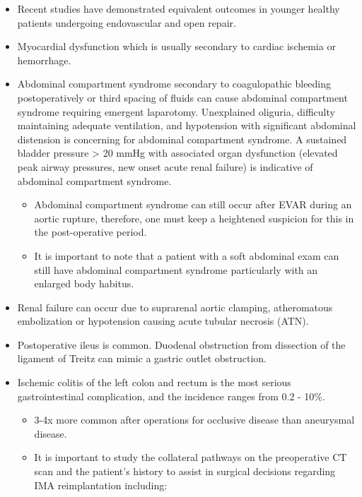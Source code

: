 \documentclass[
]{book}
\begin{document}
\begin{itemize}
\item
  Recent studies have demonstrated equivalent outcomes in younger
  healthy patients undergoing endovascular and open repair.
  \citep{liangComparablePerioperativeMortality2018}
\item
  Myocardial dysfunction which is usually secondary to cardiac
  ischemia or hemorrhage.
\item
  Abdominal compartment syndrome secondary to coagulopathic bleeding
  postoperatively or third spacing of fluids can cause abdominal
  compartment syndrome requiring emergent laparotomy. Unexplained
  oliguria, difficulty maintaining adequate ventilation, and
  hypotension with significant abdominal distension is concerning for
  abdominal compartment syndrome. A sustained bladder pressure \textgreater{} 20
  mmHg with associated organ dysfunction (elevated peak airway
  pressures, new onset acute renal failure) is indicative of abdominal
  compartment syndrome.

  \begin{itemize}
  \item
    Abdominal compartment syndrome can still occur after EVAR during
    an aortic rupture, therefore, one must keep a heightened
    suspicion for this in the post-operative period.
  \item
    It is important to note that a patient with a soft abdominal
    exam can still have abdominal compartment syndrome particularly
    with an enlarged body habitus.
  \end{itemize}
\item
  Renal failure can occur due to suprarenal aortic clamping,
  atheromatous embolization or hypotension causing acute tubular
  necrosis (ATN).
\item
  Postoperative ileus is common. Duodenal obstruction from dissection
  of the ligament of Treitz can mimic a gastric outlet obstruction.
\item
  Ischemic colitis of the left colon and rectum is the most serious
  gastrointestinal complication, and the incidence ranges from 0.2 -
  10\%.

  \begin{itemize}
  \item
    3-4x more common after operations for occlusive disease than
    aneurysmal disease.
  \item
    It is important to study the collateral pathways on the
    preoperative CT scan and the patient's history to assist in
    surgical decisions regarding IMA reimplantation including:


\end{itemize}
\end{itemize}
\end{document}
